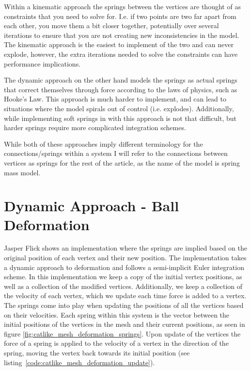 Within a kinematic approach the springs between the vertices are thought of as constraints that you need to solve for.
I.e. if two points are two far apart from each other, you move them a bit closer together, potentially over several iterations to ensure that you are not creating
new inconsistencies in the model.
The kinematic approach is the easiest to implement of the two and can never explode, however, the extra iterations needed to solve the constraints can have performance implications.

The dynamic approach on the other hand models the springs as actual springs that correct themselves through force according to the laws of physics, such as Hooke's Law.
This approach is much harder to implement, and can lead to situations where the model spirals out of control (i.e. explodes).
Additionally, while implementing soft springs in with this approach is not that difficult, but harder springs require more complicated integration schemes\cite{math_for_games}.

While both of these approaches imply different terminology for the connections/springs within a system I will refer to the connections between vertices as springs for the rest of the article, as the name of the model is spring mass model.

\section{Dynamic Approach - Ball Deformation}
Jasper Flick\cite{catlike_mesh_deformation} shows an implementation where the springs are implied based on the original position of each vertex and their new position.
The implementation takes a dynamic approach to deformation and follows a semi-implicit Euler integration scheme.
In this implementation we keep a copy of the initial vertex positions, as well as a collection of the modified vertices.
Additionally, we keep a collection of the velocity of each vertex, which we update each time force is added to a vertex.
The springs come into play when updating the positions of all the vertices based on their velocities.
Each spring within this system is the vector between the initial positions of the vertices in the mesh and their current positions, as seen in figure \ref{fig:catlike_mesh_deformation_springs}.
Upon update of the vertices the force of a spring is applied to the velocity of a vertex in the direction of the spring, moving the vertex back towards its initial position (see listing~\ref{code:catlike_mesh_deformation_update}).

